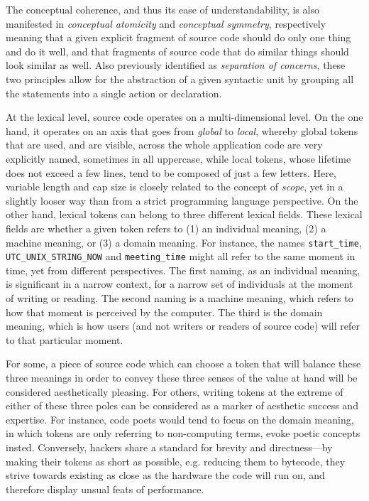The conceptual coherence, and thus its ease of understandability, is also manifested in \emph{conceptual atomicity} and \emph{conceptual symmetry}, respectively meaning that a given explicit fragment of source code should do only one thing and do it well, and that fragments of source code that do similar things should look similar as well. Also previously identified as \emph{separation of concerns}, these two principles allow for the abstraction of a given syntactic unit by grouping all the statements into a single action or declaration.

At the lexical level, source code operates on a multi-dimensional level. On the one hand, it operates on an axis that goes from \emph{global} to \emph{local}, whereby global tokens that are used, and are visible, across the whole application code are very explicitly named, sometimes in all uppercase, while local tokens, whose lifetime does not exceed a few lines, tend to be composed of just a few letters. Here, variable length and cap size is closely related to the concept of \emph{scope}, yet in a slightly looser way than from a strict programming language perspective. On the other hand, lexical tokens can belong to three different lexical fields. These lexical fields are whether a given token refers to (1) an individual meaning, (2) a machine meaning, or (3) a domain meaning. For instance, the names \lstinline{start_time}, \lstinline{UTC_UNIX_STRING_NOW} and \lstinline{meeting_time} might all refer to the same moment in time, yet from different perspectives. The first naming, as an individual meaning, is significant in a narrow context, for a narrow set of individuals at the moment of writing or reading. The second naming is a machine meaning, which refers to how that moment is perceived by the computer. The third is the domain meaning, which is how users (and not writers or readers of source code) will refer to that particular moment.

For some, a piece of source code which can choose a token that will balance these three meanings in order to convey these three senses of the value at hand will be considered aesthetically pleasing. For others, writing tokens at the extreme of either of these three poles can be considered as a marker of aesthetic success and expertise. For instance, code poets would tend to focus on the domain meaning, in which tokens are only referring to non-computing terms, evoke poetic concepts insted. Conversely, hackers share a standard for brevity and directness—by making their tokens as short as possible, e.g. reducing them to bytecode, they strive towards existing as close as the hardware the code will run on, and therefore display unsual feats of performance.

